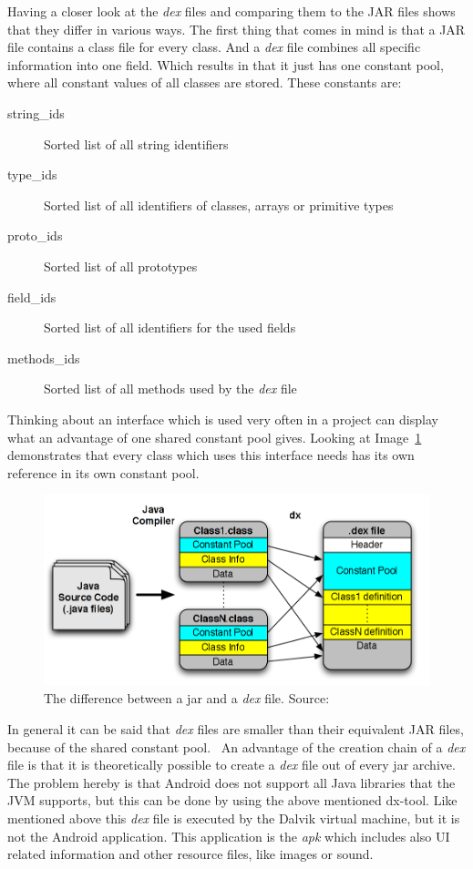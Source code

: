 Having a closer look at the \textit{dex} files and comparing them to the JAR files shows that they differ in various ways.
The first thing that comes in mind is that a JAR file contains a class file for every class.
And a \textit{dex} file combines all specific information into one field.
Which results in that it just has one constant pool, where all constant values of all classes are stored.
These constants are:
\begin{description}
  \item[string\_ids] Sorted list of all string identifiers
  \item[type\_ids] Sorted list of all identifiers of classes, arrays or primitive types
  \item[proto\_ids] Sorted list of all prototypes
  \item[field\_ids] Sorted list of all identifiers for the used fields
  \item[methods\_ids] Sorted list of all methods used by the \textit{dex} file
\end{description}
Thinking about an interface which is used very often in a project can display what an advantage of one shared constant pool gives.
Looking at Image~\ref{fig:jar-dex} demonstrates that every class which uses this interface needs has its own reference in its own constant pool.
\begin{figure}[h]
\begin{center}
\includegraphics[scale=0.41]{images/jar-dex.png} 
\caption{The difference between a jar and a \textit{dex} file. Source:~\cite{enck2011study}}
\label{fig:jar-dex}
\end{center}
\end{figure}

In general it can be said that \textit{dex} files are smaller than their equivalent JAR files, because of the shared constant pool.~\cite{bornstein2008dalvik}
An advantage of the creation chain of a \textit{dex} file is that it is theoretically possible to create a \textit{dex} file out of every jar archive.
The problem hereby is that Android does not support all Java libraries that the JVM supports, but this can be done by using the above mentioned dx-tool. 
Like mentioned above this \textit{dex} file is executed by the Dalvik virtual machine, but it is not the Android application.
This application is the \textit{apk}  which includes also UI related information and other resource files, like images or sound.

